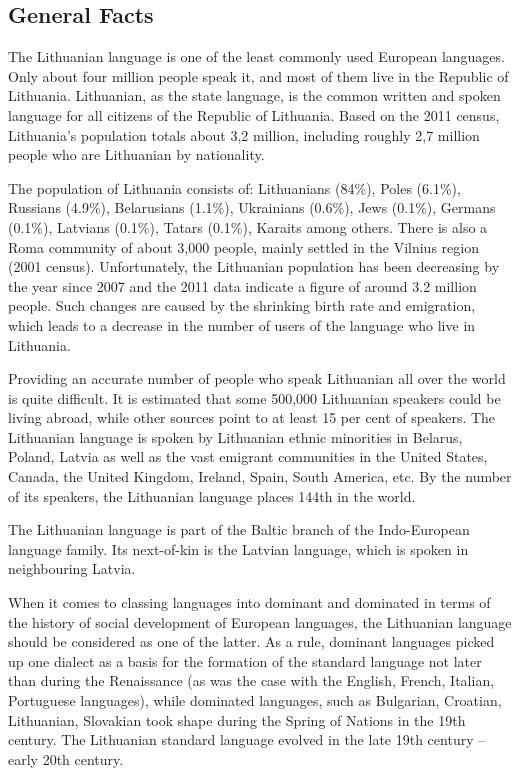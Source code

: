 \begin{multicols}{2}

\subsection{General Facts}

The Lithuanian language is one of the least commonly used European languages. Only about four million people speak it, and most of them live in the Republic of Lithuania. Lithuanian, as the state language, is the common written and spoken language for all citizens of the Republic of Lithuania. Based on the 2011 census, Lithuania’s population totals about 3,2 million, including roughly 2,7 million people who are Lithuanian by nationality. 

   The population of Lithuania consists of: Lithuanians (84\%), Poles (6.1\%), Russians (4.9\%), Belarusians (1.1\%), Ukrainians (0.6\%), Jews (0.1\%), Germans (0.1\%), Latvians (0.1\%), Tatars (0.1\%), Karaits among others.  There is also a Roma community of about 3,000 people, mainly settled in the Vilnius region (2001 census). Unfortunately, the Lithuanian population has been decreasing by the year since 2007 and the 2011 data indicate a figure of around 3.2 million people. Such changes are caused by the shrinking birth rate and emigration, which leads to a decrease in the number of users of the language who live in Lithuania.

    Providing an accurate number of people who speak Lithuanian all over the world is quite difficult. It is estimated that some 500,000 Lithuanian speakers could be living abroad, while other sources point to at least 15 per cent of speakers. The Lithuanian language is spoken by Lithuanian ethnic minorities in Belarus, Poland, Latvia as well as the vast emigrant communities in the United States, Canada, the United Kingdom, Ireland, Spain, South America, etc. By the number of its speakers, the Lithuanian language places 144th in the world.


The Lithuanian language is part of the Baltic branch of the Indo-European language family. Its next-of-kin is the Latvian language, which is spoken in neighbouring Latvia.

    When it comes to classing languages into dominant and dominated in terms of the history of social development of European languages, the Lithuanian language should be considered as one of the latter. As a rule, dominant languages picked up one dialect as a basis for the formation of the standard language not later than during the Renaissance (as was the case with the English, French, Italian, Portuguese languages), while dominated languages, such as Bulgarian, Croatian, Lithuanian, Slovakian took shape during the Spring of Nations in the 19th century. The Lithuanian standard language evolved in the late 19th century – early 20th century.


\end{multicols}
